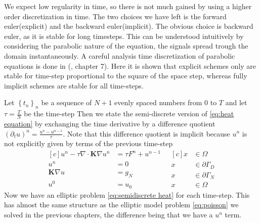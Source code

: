 \documentclass[../Main/main.tex]{subfiles}
\begin{document}
	We expect low regularity in time, so there is not much gained by using a higher order discretization in time. The two choices we have left is the forward euler(explicit) and the backward euler(implicit). The obvious choice is backward euler, as it is stable for long timesteps. This can be understood intuitively by considering the parabolic nature of the equation, the signals spread trough the domain instantaneously. A careful analysis time discretization of parabolic equations is done in (\cite{Knabner}, chapter 7).  Here it is shown that explicit schemes only are stable for time-step proportional to the square of the space step, whereas fully implicit schemes are stable for all time-steps. \par  Let $\left \{ t_n \right \}_n$ be a sequence of $N+1$ evenly spaced numbers from $0$ to $T$ and let $\tau = \frac{T}{N}$ be the time-step Then we state the semi-discrete version of \eqref{eq:heat equation} by exchanging the time derivative by a difference quotient $(\partial_t u)^n = \frac{u^n-u^{n-1}}{\tau}$. Note that this difference quotient is implicit because $u^n$ is not explicitly given by terms of the previous time-step
	\begin{equation}\label{eq:semidiscrete heat}
		\begin{aligned}[c]
			u^n - \tau \nabla \cdot \pmb{K} \nabla u^n &= \tau F^n+u^{n-1}\\
			u^n &= 0 \\
			\pmb{K}\nabla u &= g_N\\
			u^0 &= u_0
		\end{aligned}
		\ \ \
		\begin{aligned}[c]
			x &\in \Omega  \\
			x &\in \partial \Gamma_D \\
			x &\in \partial \Gamma_N \\
			x &\in \Omega  
		\end{aligned}
	\end{equation}
	Now we have an elliptic problem \eqref{eq:semidiscrete heat} for each time-step. This has almost the same structure as the elliptic model problem \eqref{eq:poisson} we solved in the previous chapters, the difference being that we have a $u^n$ term.
\end{document}
